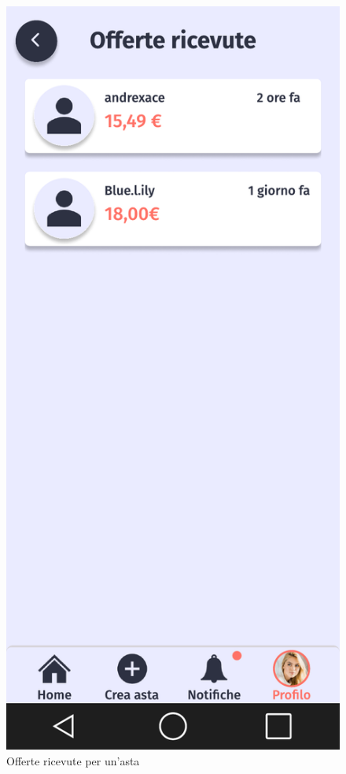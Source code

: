 \begin{figure}[!htb]
\begin{minipage}{0.32\textwidth}
            \includegraphics[width=.7\linewidth]{Immagini/Frames/Compratore/C16.pdf}
            \caption{Offerte ricevute per un'asta}
        \end{minipage}\hfill
        \begin{minipage}{0.32\textwidth}
            \centering

\end{minipage}
\end{figure}
